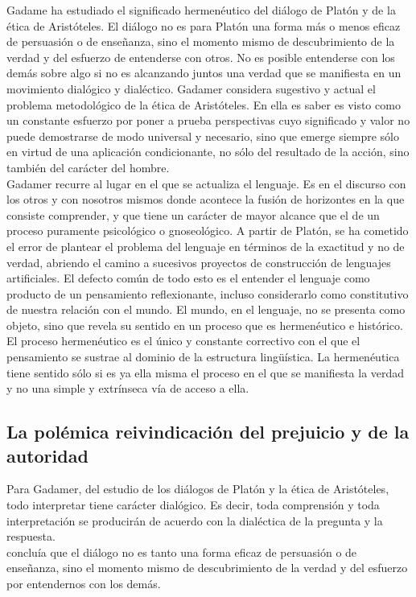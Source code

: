 \documentclass[a4paper, 11pt, twocolumn, spanish]{article}
\begin{document}
Gadame ha estudiado el significado hermenéutico del diálogo de Platón
y de la ética de Aristóteles. El diálogo no es para Platón una forma
más o menos eficaz de persuasión o de enseñanza, sino el momento mismo
de descubrimiento de la verdad y del esfuerzo de entenderse con
otros. No es posible entenderse con los demás sobre algo si no es
alcanzando juntos una verdad que se manifiesta en un movimiento
dialógico y dialéctico. Gadamer considera sugestivo y actual el
problema metodológico de la ética de Aristóteles. En ella es saber es
visto como un constante esfuerzo por poner a prueba perspectivas cuyo
significado y valor no puede demostrarse de modo universal y
necesario, sino que emerge siempre sólo en virtud de una aplicación
condicionante, no sólo del resultado de la acción, sino también del
carácter del hombre.\\[0pt]

Gadamer recurre al lugar en el que se actualiza el lenguaje. Es en el
discurso con los otros y con nosotros mismos donde acontece la fusión
de horizontes en la que consiste comprender, y que tiene un carácter
de mayor alcance que el de un proceso puramente psicológico o
gnoseológico. A partir de Platón, se ha cometido el error de plantear
el problema del lenguaje en términos de la exactitud y no de verdad,
abriendo el camino a sucesivos proyectos de construcción de lenguajes
artificiales. El defecto común de todo esto es el entender el lenguaje
como producto de un pensamiento reflexionante, incluso considerarlo
como constitutivo de nuestra relación con el mundo. El mundo, en el
lenguaje, no se presenta como objeto, sino que revela su sentido en un
proceso que es hermenéutico e histórico. El proceso hermenéutico es el
único y constante correctivo con el que el pensamiento se sustrae al
dominio de la estructura lingüística. La hermenéutica tiene sentido
sólo si es ya ella misma el proceso en el que se manifiesta la verdad
y no una simple y extrínseca vía de acceso a ella.

\subsection{La polémica reivindicación del prejuicio y de la autoridad}
\label{sec:org73239b6}
Para Gadamer, del estudio de los diálogos de Platón y la ética de
Aristóteles, todo interpretar tiene carácter dialógico. Es decir, toda
comprensión y toda interpretación se producirán de acuerdo con la
dialéctica de la pregunta y la respuesta.\\[0pt]
concluía que el diálogo no es tanto una forma eficaz de persuasión o
de enseñanza, sino el momento mismo de descubrimiento de la verdad y
del esfuerzo por entendernos con los demás.\\[0pt]
\end{document}
